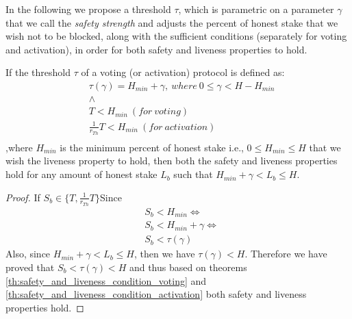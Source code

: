 %		

In the following we propose a threshold $\tau$, which is parametric on a 
parameter $\gamma$ that we call the \emph{safety strength} and adjusts the 
percent of honest stake that we wish not to be blocked, along with the 
sufficient conditions (separately for voting and activation), in order for both 
safety and liveness properties to hold.

\begin{theorem}\label{th:proposed_voting_threshold}
	If the threshold $\tau$ of a voting (or activation) protocol is 
	defined as:
	\begin{align*}
		&\tau(\gamma) = H_{min} + \gamma,\ where\ 0 \leq \gamma < H-H_{min} \\
		&\land\\
		&T < H_{min}\ (for\ voting)\\
		&\frac{1}{r_{Th}}T < H_{min}\ (for\ activation)\\
	\end{align*}
,where $H_{min}$ is the minimum percent of honest stake i.e., $0 \leq H_{min} 
\leq H$ that we wish the liveness property to hold,
then both the safety and liveness properties hold for any amount of honest 
stake $L_b$ such that $H_{min} + \gamma < L_b \leq H$.
	\begin{proof}
		If $S_b \in \{T, \frac{1}{r_{Th}}T\}$Since 
		\begin{align*}
			&S_b < H_{min} \iff\\
			&S_b < H_{min} + \gamma \iff\\
			&S_b < \tau(\gamma)
		\end{align*}
		Also, since $H_{min} + \gamma < L_b \leq H$, then we have $\tau(\gamma) 
		< H$.
		Therefore we have proved that $S_b < \tau(\gamma) < H$ and thus 
		based on theorems \ref{th:safety_and_liveness_condition_voting} and 
		\ref{th:safety_and_liveness_condition_activation} both safety 
		and 
		liveness properties hold.
	\end{proof}
\end{theorem}

